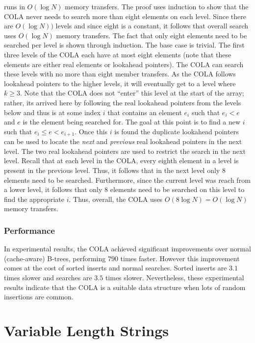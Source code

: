 \documentclass[preprint]{style}
\begin{document}
\Search{} runs in $O(\log N)$ memory transfers. The proof uses induction to
show that the COLA never needs to search more than eight elements on each
level. Since there are $O(\log N))$ levels and since eight is a constant, it
follows that overall search uses $O(\log N)$ memory transfers. The fact that
only eight elements need to be searched per level is shown through induction.
The base case is trivial. The first three levels of the COLA each have at most
eight elements (note that these elements are either real elements or
lookahead pointers). The COLA can search these levels with no more
than eight member transfers. As the COLA follows lookahead pointers to the
higher levels, it will eventually get to a level where $k \geq 3$. Note that
the COLA does not ``enter'' this level at the start of the array; rather, its
arrived here by following the real lookahead pointers from the levels below
and thus is at some index $i$ that contains an element $e_i$ such that $e_i <
e$ and $e$ is the element being searched for. The goal at this point is to
find a new $i$ such that $e_i \leq e < e_{i+1}$. Once this $i$ is found the
duplicate lookahead pointers can be used to locate the \textit{next} and
\textit{previous} real lookahead pointers in the next level. The two real lookahead
pointers are used to restrict the search in the next level. Recall that at
each level in the COLA, every eighth element in a level is present in the
previous level. Thus, it follows that in the next level only 8 elements need
to be searched. Furthermore, since the current level was reach from a lower
level, it follows that only 8 elements need to be searched on this level to
find the appropriate $i$. Thus, overall, the COLA uses $O(8\log{N}) =
O(\log{N})$ memory transfers.

\subsubsection{Performance}

In experimental results, the COLA achieved significant improvements over
normal (cache-aware) B-trees, performing $790$ times faster. However this
improvement comes at the cost of sorted inserts and normal searches. Sorted
inserts are $3.1$ times slower and searches are $3.5$ times slower. Nevertheless,
these experimental results indicate that the COLA is a suitable data
structure when lots of random insertions are common.

\section{Variable Length Strings}
\end{document}
